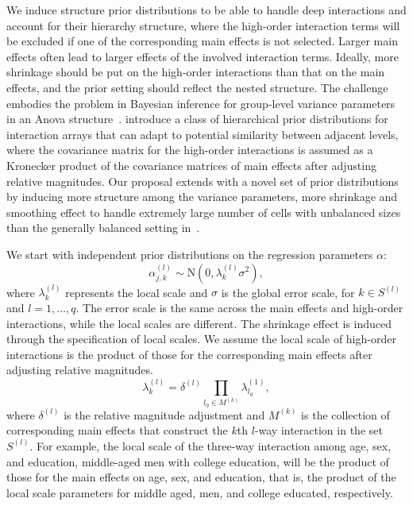 \documentclass[11pt]{article}
\begin{document}
We induce structure prior distributions to be able to handle deep interactions and account for their hierarchy structure, where the high-order interaction terms will be excluded if one of the corresponding main effects is not selected. Larger main effects often lead to larger effects of the involved interaction terms. Ideally, more shrinkage should be put on the high-order interactions than that on the main effects, and the prior setting should reflect the nested structure. The challenge embodies the problem in Bayesian inference for group-level variance parameters in an Anova structure~\citep{anova:gelman:05, gelman06-prior}. \cite{volfovsky:hoff14} introduce a class of hierarchical prior distributions for interaction arrays that can adapt to potential similarity between adjacent levels, where the covariance matrix for the high-order interactions is assumed as a Kronecker product of the covariance matrices of main effects after adjusting relative magnitudes. Our proposal extends with a novel set of prior distributions by inducing more structure among the variance parameters, more shrinkage and smoothing effect to handle extremely large number of cells with unbalanced sizes than the generally balanced setting in~\cite{volfovsky:hoff14}. 

We start with independent prior distributions on the regression parameters $\alpha$:
\[\alpha_{j,k}^{(l)}\sim \textrm{N}(0, \lambda_k^{(l)}\sigma^2),\]
where $\lambda_k^{(l)}$ represents the local scale and $\sigma$ is the global error scale, for $k\in S^{(l)}$ and $l=1,\dots, q$. The error scale is the same across the main effects and high-order interactions, while the local scales are different. The shrinkage effect is induced through the specification of local scales. We assume the local scale of high-order interactions is the product of those for the corresponding main effects after adjusting relative magnitudes.
\[\lambda^{(l)}_k=\delta^{(l)}\prod_{l_0\in M^{(k)}}\lambda^{(1)}_{l_0},\]
where $\delta^{(l)}$ is the relative magnitude adjustment and $M^{(k)}$ is the collection of corresponding main effects that construct the $k$th $l$-way interaction in the set $S^{(l)}$. For example, the local scale of the three-way interaction among age, sex, and education, middle-aged men with college education, will be the product of those for the main effects on age, sex, and education, that is, the product of the local scale parameters for middle aged, men, and college educated, respectively. 
\end{document}
